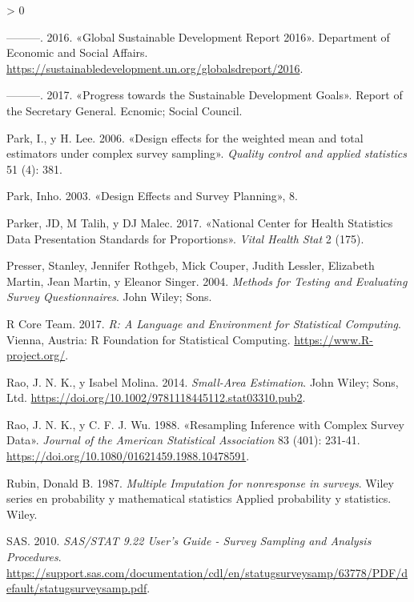 \documentclass[
  12pt,
  spanish,
]{book}
\newlength{\cslhangindent}
\newenvironment{CSLReferences}[2] %
 {%
  \setlength{\parindent}{0pt}
  \ifodd #1 \everypar{\setlength{\hangindent}{\cslhangindent}}\ignorespaces\fi
  \ifnum #2 > 0
  \setlength{\parskip}{#2\baselineskip}
  \fi
 }%
 {}
\begin{document}
\begin{CSLReferences}{1}{0}
\leavevmode\hypertarget{ref-United_Nations_2016}{}%
---------. 2016. {«Global Sustainable Development Report 2016»}. {Department of Economic and Social Affairs}. \url{https://sustainabledevelopment.un.org/globalsdreport/2016}.

\leavevmode\hypertarget{ref-United_Nations_2017}{}%
---------. 2017. {«Progress towards the Sustainable Development Goals»}. Report of the Secretary General. Ecnomic; Social Council.

\leavevmode\hypertarget{ref-Park_Lee_2006}{}%
Park, I., y H. Lee. 2006. {«Design effects for the weighted mean and total estimators under complex survey sampling»}. \emph{Quality control and applied statistics} 51 (4): 381.

\leavevmode\hypertarget{ref-Park_2003}{}%
Park, Inho. 2003. {«Design Effects and Survey Planning»}, 8.

\leavevmode\hypertarget{ref-Parker_Talih_Malec_2017}{}%
Parker, JD, M Talih, y DJ Malec. 2017. {«National Center for Health Statistics Data Presentation Standards for Proportions»}. \emph{Vital Health Stat} 2 (175).

\leavevmode\hypertarget{ref-Presser_Rothgeb_Couper_Lessler_Martin_Martin_Singer_2004}{}%
Presser, Stanley, Jennifer Rothgeb, Mick Couper, Judith Lessler, Elizabeth Martin, Jean Martin, y Eleanor Singer. 2004. \emph{Methods for Testing and Evaluating Survey Questionnaires}. John Wiley; Sons.

\leavevmode\hypertarget{ref-R_2017}{}%
R Core Team. 2017. \emph{R: A Language and Environment for Statistical Computing}. Vienna, Austria: R Foundation for Statistical Computing. \url{https://www.R-project.org/}.

\leavevmode\hypertarget{ref-Rao_Molina_2014}{}%
Rao, J. N. K., y Isabel Molina. 2014. \emph{Small-Area Estimation}. John Wiley; Sons, Ltd. \url{https://doi.org/10.1002/9781118445112.stat03310.pub2}.

\leavevmode\hypertarget{ref-Rao_Wu_1988}{}%
Rao, J. N. K., y C. F. J. Wu. 1988. {«Resampling Inference with Complex Survey Data»}. \emph{Journal of the American Statistical Association} 83 (401): 231-41. \url{https://doi.org/10.1080/01621459.1988.10478591}.

\leavevmode\hypertarget{ref-Rubin_1987}{}%
Rubin, Donald B. 1987. \emph{Multiple Imputation for nonresponse in surveys}. Wiley series en probability y mathematical statistics Applied probability y statistics. Wiley.

\leavevmode\hypertarget{ref-SAS_2017}{}%
SAS. 2010. \emph{SAS/STAT 9.22 User's Guide - Survey Sampling and Analysis Procedures}. \url{https://support.sas.com/documentation/cdl/en/statugsurveysamp/63778/PDF/default/statugsurveysamp.pdf}.


\end{CSLReferences}
\end{document}
